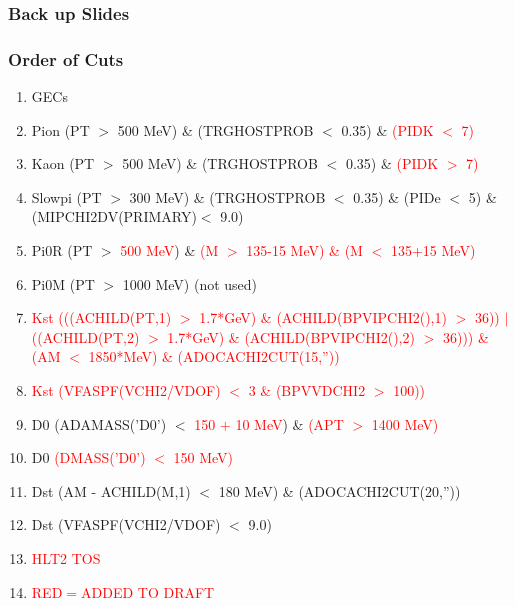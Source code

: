 \documentclass[10pt,a4paper]{beamer}
\begin{document}
\begin{frame}
\frametitle{Back up Slides}
\end{frame}

\begin{frame}
\frametitle{Order of Cuts}
\begin{enumerate}
\item{GECs}
\item{Pion (PT $>$ 500 MeV) \& (TRGHOSTPROB $<$ 0.35) \& \textcolor{red}{(PIDK $<$ 7)}}
\item{Kaon (PT $>$ 500 MeV) \& (TRGHOSTPROB $<$ 0.35) \& \textcolor{red}{(PIDK $>$ 7)}}		
\item{Slowpi (PT $>$ 300 MeV) \& (TRGHOSTPROB $<$ 0.35) \& (PIDe $<$ 5) \& (MIPCHI2DV(PRIMARY)$<$ 9.0)}
\item{Pi0R (PT $>$ \textcolor{red}{500 MeV}) \& \textcolor{red}{(M $>$ 135-15 MeV) \& (M $<$ 135+15 MeV)}}
\item{Pi0M (PT $>$ 1000 MeV) (not used)}
\item{\textcolor{red}{Kst (((ACHILD(PT,1) $>$ 1.7*GeV) \& (ACHILD(BPVIPCHI2(),1) $>$ 36)) $|$ ((ACHILD(PT,2) $>$ 1.7*GeV) \& (ACHILD(BPVIPCHI2(),2) $>$ 36))) \& (AM $<$ 1850*MeV) \& (ADOCACHI2CUT(15,''))}}
\item{\textcolor{red}{Kst (VFASPF(VCHI2/VDOF) $<$ 3 \& (BPVVDCHI2 $>$ 100))}}
\item{D0 (ADAMASS('D0') $<$ \textcolor{red}{150 $+$ 10 MeV}) \& \textcolor{red}{(APT $>$ 1400 MeV)}}
\item{D0 \textcolor{red}{(DMASS('D0') $<$ 150 MeV)} }
\item{Dst (AM - ACHILD(M,1) $<$ 180 MeV) \& (ADOCACHI2CUT(20,''))}
\item{Dst (VFASPF(VCHI2/VDOF) $<$ 9.0)}			
\item{\textcolor{red}{HLT2 TOS}}		
\item[]{\textcolor{red}{\hspace{9.0em} RED$=$ADDED TO DRAFT }}		
\end{enumerate}
\end{frame}
\end{document}
